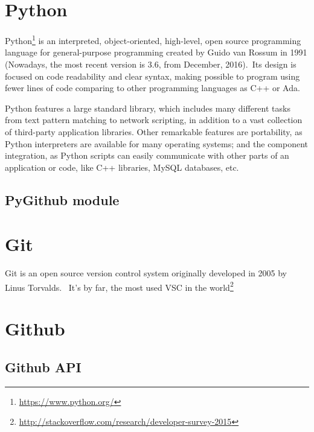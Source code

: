 \documentclass[a4paper, 12pt]{book}
\begin{document}
\section{Python}
\label{sec:python}
Python\footnote{\url{https://www.python.org/}} is an interpreted, object-oriented, high-level, open source programming language for general-purpose programming created by Guido van Rossum in 1991 (Nowadays, the most recent version is 3.6, from December, 2016).\ Its design is focused on code readability and clear syntax, making possible to program using fewer lines of code comparing to other programming languages as C++ or Ada.\

Python features a large standard library, which includes many different tasks from text pattern matching to network scripting, in addition to a vast collection of third-party application libraries.
Other remarkable features are portability, as Python interpreters are available for many operating systems; and the component integration, as Python scripts can easily communicate with other parts of an application or code, like C++ libraries, MySQL databases, etc.\\

\subsection{PyGithub module}
\label{sec:pygithub}

\section{Git}
\label{sec:git}
Git is an open source version control system originally developed in 2005 by Linus Torvalds. \
It's by far, the most used VSC in the world\footnote{\url{http://stackoverflow.com/research/developer-survey-2015}}

\section{Github}
\label{sec:github}

\subsection{Github API}
\end{document}
